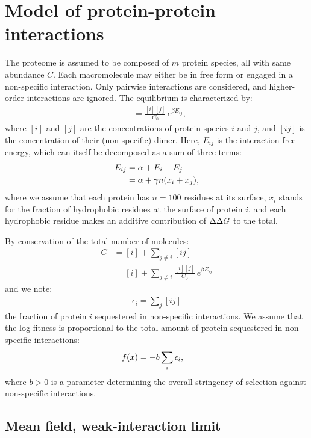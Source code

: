 \documentclass{article}
\begin{document}
\section{Model of protein-protein interactions}
\label{sec:model-of-protein-protein-interactions}

The proteome is assumed to be composed of $m$ protein species, all with same abundance $C$.
Each macromolecule may either be in free form or engaged in a non-specific interaction.
Only pairwise interactions are considered, and higher-order interactions are ignored.
The equilibrium is characterized by:
\begin{align}
[ij]
    & = \frac{[i][j]}{C_0} \, e^{\beta E_{ij}},
\end{align}
where $[i]$ and $[j]$ are the concentrations of protein species $i$ and $j$, and $[ij]$ is the concentration of their (non-specific) dimer. Here, $E_{ij}$ is the interaction free energy, which can itself be decomposed as a sum of three terms:
\begin{align}
    E_{ij} & = \alpha + E_i + E_j
    \\
    & = \alpha + \gamma n (x_i + x_j),
\end{align}
where we assume that each protein has $n=100$ residues at its surface, $x_i$ stands for the fraction of hydrophobic residues at the surface of protein $i$, and each hydrophobic residue makes an additive contribution of $\Delta \Delta G$ to the total.

By conservation of the total number of molecules:
\begin{align}
    C & = [i] + \sum\limits_{j \neq i} [ij] \\
    & = [i] + \sum\limits_{j \neq i} \frac{[i][j]}{C_0} \, e^{\beta E_{ij}}
\end{align}
and we note:
\begin{align}
    \epsilon_i = \sum_j [ij]
\end{align}
the fraction of protein $i$ sequestered in non-specific interactions.
We assume that the log fitness is proportional to the total amount of protein sequestered in non-specific interactions:
\begin{align}
    f (x) & = -b \sum_i \epsilon_i,
\end{align}
where $b>0$ is a parameter determining the overall stringency of selection against non-specific interactions.

\subsection{Mean field, weak-interaction limit}
\label{subsec:mean-field-interaction-limit}
\end{document}
